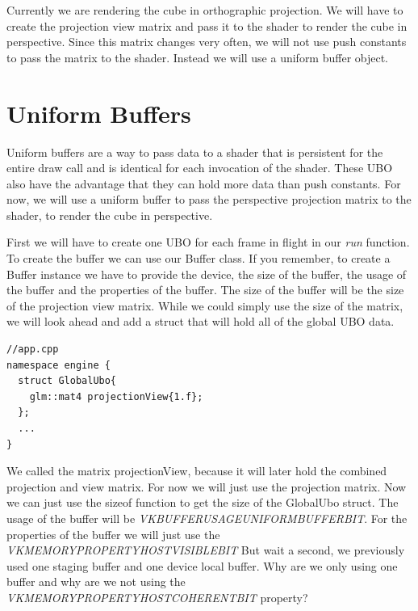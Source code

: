 \documentclass[12pt]{report} \usepackage{preamble}
\begin{document}
Currently we are rendering the cube in orthographic projection. We will have to create the projection view matrix and pass it to the shader to render the cube in perspective.
Since this matrix changes very often, we will not use push constants to pass the matrix to the shader. Instead we will use a uniform buffer object.

\section{Uniform Buffers}

Uniform buffers are a way to pass data to a shader that is persistent for the entire draw call and is identical for each invocation of the shader.
These \ac{UBO} also have the advantage that they can hold more data than push constants. For now, we will use a uniform buffer to pass the perspective projection matrix to the shader,
to render the cube in perspective.

First we will have to create one \ac{UBO} for each frame in flight in our \textit{run} function. To create the buffer we can use our Buffer class.
If you remember, to create a Buffer instance we have to provide the device, the size of the buffer, the usage of the buffer and the properties of the buffer.
The size of the buffer will be the size of the projection view matrix. While we could simply use the size of the matrix, we will look ahead and add a struct that will hold all of the
global \ac{UBO} data.

\begin{lstlisting}[Language=C++]
//app.cpp
namespace engine {
  struct GlobalUbo{
    glm::mat4 projectionView{1.f};
  };
  ...
}
\end{lstlisting}

We called the matrix projectionView, because it will later hold the combined projection and view matrix. For now we will just use the projection matrix.
Now we can just use the sizeof function to get the size of the GlobalUbo struct. The usage of the buffer will be \textit{VK\textunderscore BUFFER\textunderscore USAGE\textunderscore UNIFORM\textunderscore BUFFER\textunderscore BIT}.
For the properties of the buffer we will just use the \\ \textit{VK\textunderscore MEMORY\textunderscore PROPERTY\textunderscore HOST\textunderscore VISIBLE\textunderscore BIT}
But wait a second, we previously used one staging buffer and one device local buffer. Why are we only using one buffer and why are we not using the \textit{VK\textunderscore MEMORY\textunderscore PROPERTY\textunderscore HOST\textunderscore COHERENT\textunderscore BIT} property?
\end{document}
